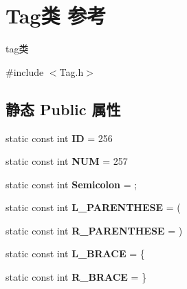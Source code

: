 \hypertarget{class_tag}{}\section{Tag类 参考}
\label{class_tag}


tag类  




{\ttfamily \#include $<$Tag.\+h$>$}

\subsection*{静态 Public 属性}
\begin{DoxyCompactItemize}
\item 
static const int {\bfseries ID} = 256\hypertarget{class_tag_acdf9d38c11c7dff1026caea53454d62c}{}\label{class_tag_acdf9d38c11c7dff1026caea53454d62c}

\item 
static const int {\bfseries N\+UM} = 257\hypertarget{class_tag_a37bd7cc8cc362fca325f553b2844d745}{}\label{class_tag_a37bd7cc8cc362fca325f553b2844d745}

\item 
static const int {\bfseries Semicolon} = \textquotesingle{};\textquotesingle{}\hypertarget{class_tag_a383b3b3d27ad94992a9345cf51632f31}{}\label{class_tag_a383b3b3d27ad94992a9345cf51632f31}

\item 
static const int {\bfseries L\+\_\+\+P\+A\+R\+E\+N\+T\+H\+E\+SE} = \textquotesingle{}(\textquotesingle{}\hypertarget{class_tag_a3f592bff8a566859e6953cd380e809e7}{}\label{class_tag_a3f592bff8a566859e6953cd380e809e7}

\item 
static const int {\bfseries R\+\_\+\+P\+A\+R\+E\+N\+T\+H\+E\+SE} = \textquotesingle{})\textquotesingle{}\hypertarget{class_tag_a06f70b28d8eb3e9f3d2d7dcc6a318fee}{}\label{class_tag_a06f70b28d8eb3e9f3d2d7dcc6a318fee}

\item 
static const int {\bfseries L\+\_\+\+B\+R\+A\+CE} = \textquotesingle{}\{\textquotesingle{}\hypertarget{class_tag_a27f8b6e653f63d5a04cbf773d7aef40d}{}\label{class_tag_a27f8b6e653f63d5a04cbf773d7aef40d}

\item 
static const int {\bfseries R\+\_\+\+B\+R\+A\+CE} = \textquotesingle{}\}\textquotesingle{}\hypertarget{class_tag_ac75cf51168e5f889ec56a8e5cebc4483}{}\label{class_tag_ac75cf51168e5f889ec56a8e5cebc4483}


\end{DoxyCompactItemize}
